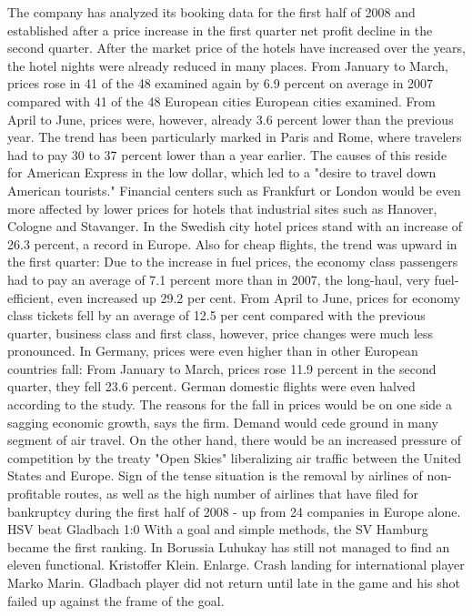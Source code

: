 The company has analyzed its booking data for the first half of 2008 and established after a price increase in the first quarter net profit decline in the second quarter.
After the market price of the hotels have increased over the years, the hotel nights were already reduced in many places.
From January to March, prices rose in 41 of the 48 examined again by 6.9 percent on average in 2007 compared with 41 of the 48 European cities European cities examined.
From April to June, prices were, however, already 3.6 percent lower than the previous year.
The trend has been particularly marked in Paris and Rome, where travelers had to pay 30 to 37 percent lower than a year earlier.
The causes of this reside for American Express in the low dollar, which led to a "desire to travel down American tourists."
Financial centers such as Frankfurt or London would be even more affected by lower prices for hotels that industrial sites such as Hanover, Cologne and Stavanger.
In the Swedish city hotel prices stand with an increase of 26.3 percent, a record in Europe.
Also for cheap flights, the trend was upward in the first quarter:
Due to the increase in fuel prices, the economy class passengers had to pay an average of 7.1 percent more than in 2007, the long-haul, very fuel-efficient, even increased up 29.2 per cent.
From April to June, prices for economy class tickets fell by an average of 12.5 per cent compared with the previous quarter, business class and first class, however, price changes were much less pronounced.
In Germany, prices were even higher than in other European countries fall:
From January to March, prices rose 11.9 percent in the second quarter, they fell 23.6 percent.
German domestic flights were even halved according to the study.
The reasons for the fall in prices would be on one side a sagging economic growth, says the firm.
Demand would cede ground in many segment of air travel.
On the other hand, there would be an increased pressure of competition by the treaty "Open Skies" liberalizing air traffic between the United States and Europe.
Sign of the tense situation is the removal by airlines of non-profitable routes, as well as the high number of airlines that have filed for bankruptcy during the first half of 2008 - up from 24 companies in Europe alone.
HSV beat Gladbach 1:0
With a goal and simple methods, the SV Hamburg became the first ranking.
In Borussia Luhukay has still not managed to find an eleven functional.
Kristoffer Klein. Enlarge. Crash landing for international player Marko Marin.
Gladbach player did not return until late in the game and his shot failed up against the frame of the goal.
